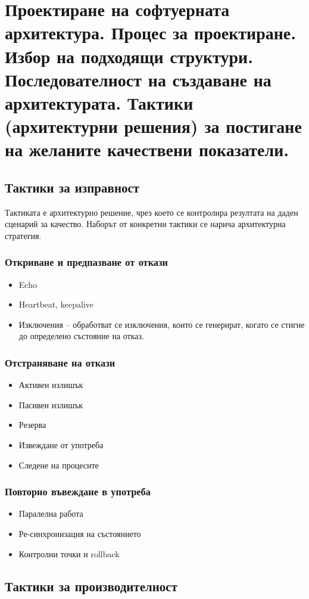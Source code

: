 \documentclass[fleqn,12pt]{article}
\begin{document}
\section{Проектиране на софтуерната архитектура. Процес за проектиране. Избор на
подходящи структури. Последователност на създаване на архитектурата.
Тактики (архитектурни решения) за постигане на желаните качествени
показатели.}

\subsection{Тактики за изправност}
Тактиката е архитектурно решение, чрез което се контролира
резултата на даден сценарий за качество. Наборът от конкретни
тактики се нарича архитектурна
стратегия.
\subsubsection{Откриване и предпазване от откази}
\begin{itemize}
\item Echo
\item Heartbeat, keepalive
\item Изключения – обработват се изключения, които се генерират, когато се стигне до определено състояние на отказ.
\end{itemize}
\subsubsection{Отстраняване на откази}
\begin{itemize}
\item Активен излишък
\item Пасивен излишък
\item Резерва
\item Извеждане от употреба
\item Следене на процесите
\end{itemize}
\subsubsection{Повторно въвеждане в употреба}
\begin{itemize}
\item Паралелна работа
\item Ре-синхронизация на състоянието
\item Контролни точки и rollback
\end{itemize}

\subsection{Тактики за производителност}
\end{document}
